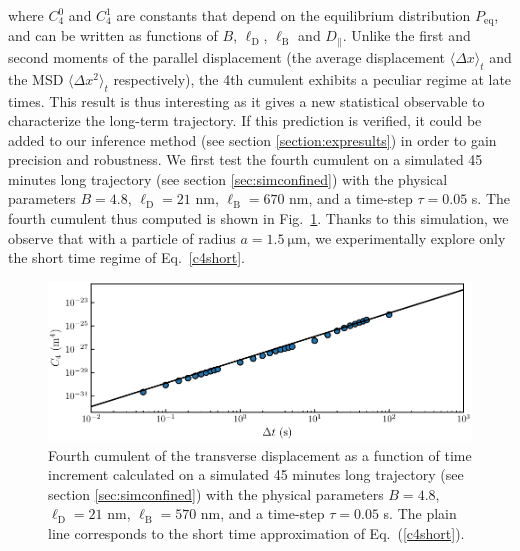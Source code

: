 {where $ C_4 ^0$ and $ C_4 ^1$ are constants that depend on the equilibrium distribution $P_\mathrm{eq}$, and can be written as functions of $B$, $\ell _ \mathrm{D}$, $\ell _\mathrm{B}$ and $D_\parallel$. Unlike the first and second moments of the parallel displacement (the average displacement $\langle \Delta x \rangle_t$ and the \gls{MSD} $\langle \Delta x ^2 \rangle_t $ respectively), the 4th cumulent exhibits a peculiar regime at late times. This result is thus interesting as it gives a new statistical observable to characterize the long-term trajectory. If this prediction is verified, it could be added to our inference method (see section \ref{section:expresults}) in order to gain precision and robustness. We first test the fourth cumulent on a simulated 45 minutes long trajectory (see section \ref{sec:simconfined}) with the physical parameters $B=4.8$, $\ell_\mathrm{D} = 21$ nm, $\ell_\mathrm{B} = 670$ nm, and a time-step $\tau = 0.05$ s. The fourth cumulent thus computed is shown in Fig.~\ref{fig.simc4}. Thanks to this simulation, we observe that with a particle of radius $a=1.5 ~\mathrm{\mu m}$, we experimentally explore only the short time regime of Eq.~\ref{c4short}.

\begin{figure}[H]
	\centering
	\includegraphics{02_body/chapter4/images/4th_cumulent/simulatedc4.pdf}
	\caption{Fourth cumulent of the transverse displacement as a function of time increment calculated on a simulated 45 minutes long trajectory (see section \ref{sec:simconfined}) with the physical parameters $B=4.8$, $\ell_\mathrm{D} = 21$ nm, $\ell_\mathrm{B} = 570$ nm, and a time-step $\tau = 0.05$ s. The plain line corresponds to the short time approximation of Eq.~(\ref{c4short}).}
	\label{fig.simc4}
\end{figure}

}
